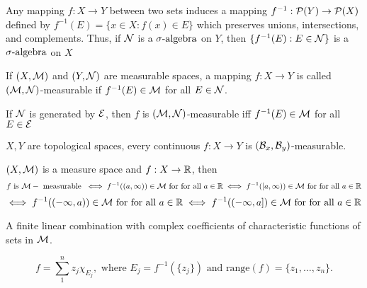 \begin{rmk}
Any mapping $f: X \rightarrow Y$ between two sets induces a mapping $f^{-1}: {\mathcal P} (Y) \rightarrow {\mathcal P}(X)$ defined by $f^{-1}(E)= \{ x \in X : f(x) \in E \}$ which preserves unions, intersections, and complements. Thus, if ${\mathcal N}$ is a ${\sigma}\text{-algebra}$ on $Y$, then $\{ f^{-1}(E) : E \in {\mathcal N} \}$ is a ${\sigma}\text{-algebra}$ on $X$
\end{rmk}

\begin{dfn}
	If $(X, {\mathcal M})$ and $(Y, {\mathcal N})$ are measurable spaces, a mapping $f: X \rightarrow Y$ is called $({\mathcal M}, {\mathcal N})$-measurable if $f^{-1}(E) \in {\mathcal M}$ for all $E \in {\mathcal N}$.
\end{dfn}
\begin{prop}
If ${\mathcal N}$ is generated by ${\mathcal E}$, then $f$ is $({\mathcal M}, {\mathcal N})$-measurable iff $f^{-1}(E) \in {\mathcal M}$ for all $E \in {\mathcal E}$	
\end{prop}

\begin{cor}
$X, Y$ are topological spaces, every continuous $f: X \rightarrow Y$ is $({\mathcal B}_x, {\mathcal B}_y) $-measurable. 	
\end{cor}

\begin{prop} $(X, {\mathcal M})$ is a measure space and $f: X \rightarrow {\mathbb R}$, then \[
f \text{ is } {\mathcal M}-\text{ measurable } \iff f^{-1}((a, \infty )) \in {\mathcal M} \text{ for for all } a \in {\mathbb R} \iff f^{-1}([a, \infty )) \in {\mathcal M} \text{ for for all } a \in {\mathbb R} 
\]
\[
\iff  f^{-1}((- \infty, a )) \in {\mathcal M} \text{ for for all } a \in {\mathbb R} \iff f^{-1}((- \infty , a]) \in {\mathcal M} \text{ for for all } a \in {\mathbb R} 
\]
	
\end{prop}

\begin{dfn}
A finite linear combination with complex coefficients of characteristic functions of sets in ${\mathcal M}$.	
\end{dfn}

\begin{dfn}
\[
f = \sum_1^n z_j \chi_{E_j}, \text{ where } E_j = f^{-1}(\{ z_j \}) \text{ and range}(f)= \{ z_1, \dots, z_n \}.
\]	
\end{dfn}




